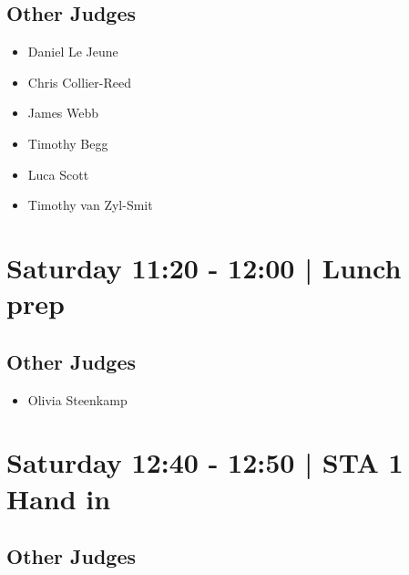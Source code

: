 \documentclass[10pt]{article}
\begin{document}
                
        \subsection*{Other Judges}
        
            \begin{itemize}
                            \item Daniel Le Jeune
                            \item Chris Collier-Reed
                            \item James Webb
                            \item Timothy Begg
                            \item Luca Scott
                            \item Timothy van Zyl-Smit
                        \end{itemize}
        

            \section*{Saturday 11:20
        -
        12:00
        |
         Lunch prep}
        
                
        \subsection*{Other Judges}
        
            \begin{itemize}
                            \item Olivia Steenkamp
                        \end{itemize}
        

            \section*{Saturday 12:40
        -
        12:50
        |
         STA 1 Hand in}
        
                
        \subsection*{Other Judges}
        
            \begin{itemize}
                        \end{itemize}
        
\end{document}
